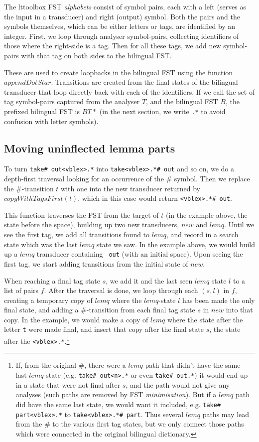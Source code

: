 \documentclass[10pt, a4paper]{article}
\newcommand{\ana}[1]{\texttt{#1}}
\begin{document}
The lttoolbox FST \emph{alphabets} consist of symbol pairs, each with
a left (serves as the input in a transducer) and right (output)
symbol. Both the pairs and the symbols themselves, which can be either
letters or tags, are identified by an integer. First, we loop through
analyser symbol-pairs, collecting identifiers of those where the
right-side is a tag. Then for all these tags, we add new symbol-pairs
with that tag on both sides to the bilingual FST.

These are used to create loopbacks in the bilingual FST using the
function $appendDotStar$. Transitions are created from the final
states of the bilingual transducer that loop directly back with each
of the identifiers. If we call the set of tag symbol-pairs captured
from the analyser $T$, and the bilingual FST $B$, the prefixed
bilingual FST is $B T*$ (in the next section, we write \ana{.*} to
avoid confusion with letter symbols).

\subsection{Moving uninflected lemma parts}
\label{sec:lemqmove}

To turn \ana{take\# out<vblex>.*} into \ana{take<vblex>.*\# out} and
so on, we do a depth-first traversal looking for an occurrence of the
\# symbol. Then we replace the \#-transition $t$ with one into the new
transducer returned by $copyWithTagsFirst(t)$, which in this case
would return \ana{<vblex>.*\# out}.

This function traverses the FST from the target of $t$ (in the example
above, the state before the space), building up two new transducers,
$new$ and $lemq$. Until we see the first tag, we add all transitions
found to $lemq$, and record in a search state which was the last
$lemq$ state we saw. In the example above, we would build up a $lemq$
transducer containing \ana{ out} (with an initial space). Upon seeing
the first tag, we start adding transitions from the initial state of
$new$.

When reaching a final tag state $s$, we add it and the last seen
$lemq$ state $l$ to a list of pairs $f$. After the traversal is done,
we loop through each $(s,l)$ in $f$, creating a temporary copy of
$lemq$ where the $lemq$-state $l$ has been made the only final state,
and adding a \#-transition from each final tag state $s$ in $new$ into
that copy. In the example, we would make a copy of $lemq$ where the
state after the letter \ana{t} were made final, and insert that copy
after the final state $s$, the state after the
\ana{<vblex>.*}.\footnote{If, from the original \#, there were a
  $lemq$ path that didn't have the same last-$lemq$-state (e.g.
  \ana{take\# out<n>.*} or even \ana{take\# out.*}) it would end up in
  a state that were not final after $s$, and the path would not give
  any analyses (such paths are removed by FST \emph{minimisation}).
  But if a $lemq$ path did have the same last state, we would want it
  included, e.g. \ana{take\# part<vblex>.*} to \ana{take<vblex>.*\#
    part}. Thus several $lemq$ paths may lead from the \# to the
  various first tag states, but we only connect those paths which were
  connected in the original bilingual dictionary.}
\end{document}
